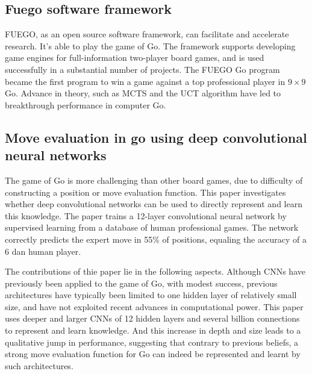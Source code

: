 \subsection{Fuego software framework~\cite{enzenberger2010fuego}}
FUEGO, as an open source software framework, can facilitate and accelerate research. 
It's able to play the game of Go. The framework supports developing game engines for full-information two-player 
board games, and is used successfully in a substantial number of projects. The FUEGO 
Go program became the first program to win a game against a top professional player in $9 \times 9$ Go.
Advance in theory, such as MCTS and the UCT algorithm have led to breakthrough performance in computer Go.
\subsection{Move evaluation in go using deep convolutional neural networks~\cite{maddison2014move, clark2015training}}
The game of Go is more challenging than other board games, due to difficulty of constructing a position or move evaluation function. This paper investigates whether deep convolutional networks can be used to directly represent and learn this knowledge. The paper trains a 12-layer convolutional neural network by supervised learning from a database of human professional games. The network correctly predicts the expert move in 55\% of positions, equaling the accuracy of a 6 dan human player.

The contributions of thie paper lie in the following aspects. Although CNNs have previously been applied to the game of Go, with modest success, previous architectures have typically been limited to one hidden layer of relatively small size, and have not exploited recent advances in computational power. This paper uses deeper and larger CNNs of 12 hidden layers and several billion connections to represent and learn knowledge. And this increase in depth and size leads to a qualitative jump in performance, suggesting that contrary to previous beliefs, a strong move evaluation function for Go can indeed be represented and learnt by such architectures.

